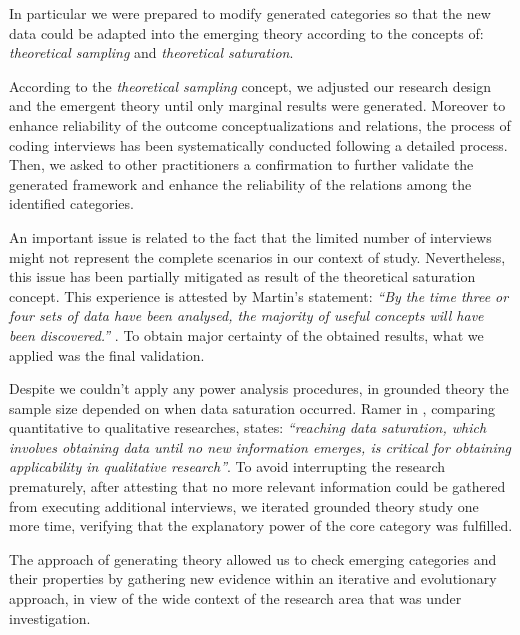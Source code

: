 \documentclass[10pt,journal,letterpaper,compsoc]{IEEEtran}
\begin{document}
In particular we were prepared to modify generated categories so that the new 
data could be adapted into the emerging theory according to the concepts of: 
\textit{theoretical sampling} and \textit{theoretical saturation}.

According to the \textit{theoretical sampling} concept, we adjusted our 
research design and the emergent theory until only marginal results were 
generated. Moreover to enhance reliability of the outcome conceptualizations and 
relations, the process of coding interviews has been systematically conducted 
following a detailed process. Then, we asked to other practitioners a 
confirmation to further validate the generated framework and enhance the 
reliability of the relations among the identified categories.

An important issue is related to the fact that the limited number of interviews 
might not represent the complete scenarios in our context of study. 
Nevertheless, this issue has been partially mitigated as result of the 
theoretical saturation concept. This experience is attested by Martin's 
statement: \textit{``By the time three or four sets of data have been analysed, 
the majority of useful concepts will have been discovered.''} 
\cite{giardinoEtAl}. To obtain major certainty of the obtained results, what we 
applied was the final validation.

Despite we couldn't apply any power analysis procedures, in grounded theory the 
sample size depended on when data saturation occurred. Ramer in \cite{Ramer}, 
comparing quantitative to qualitative researches, states: \textit{``reaching 
data saturation, which involves obtaining data until no new information emerges, 
is critical for obtaining applicability in qualitative research''}. To avoid 
interrupting the research prematurely, after attesting that no more relevant 
information could be gathered from executing additional interviews, we iterated 
grounded theory study one more time, verifying that the explanatory power of the 
core category was fulfilled.

The  approach of generating theory allowed us to check emerging categories 
and their properties by gathering new evidence within an iterative and 
evolutionary approach, in view of the wide context of the research area that was 
under investigation.


\end{document}
